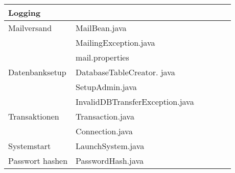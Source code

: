 \begin{landscape}
\begin{tabular}{|p{6cm} |p{6cm}|p{3cm}|p{3cm}|p{2cm}|p{3cm}|}
	\hline  Logging              &                                            &                            &                             &                     &\\ 
	\hline  Mailversand          & MailBean.java                              &                            &                             &                     &\\ 	
	& MailingException.java                      &                            &                             &                     &\\
	& mail.properties                            &                            &                             &                     &\\
	\hline Datenbanksetup        & DatabaseTableCreator. java                 &                            &                             &                     &\\
	& SetupAdmin.java                            &                            &                             &                     &\\
	& InvalidDBTransferException.java            &                            &                             &                     &\\
	\hline Transaktionen         & Transaction.java                           &                            &                             &                     &\\  
	& Connection.java                            &                            &                             &                     &\\  
	\hline Systemstart           & LaunchSystem.java                          &                            &                             &                     &\\
	\hline Passwort hashen       & PasswordHash.java                          &                            &                             &                     &\\       	   
	\hline 
\end{tabular} \ \\
\ \\


\end{landscape}
